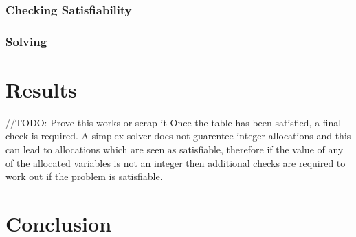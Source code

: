 \documentclass{report}
\begin{document}
\subsection {Checking Satisfiability}
\subsection {Solving}
\chapter {Results}

//TODO: Prove this works or scrap it
Once the table has been satisfied, a final check is required. A simplex solver does not guarentee integer allocations and this can lead to allocations which are seen as satisfiable, therefore if the value of any of the allocated variables is not an integer then additional checks are required to work out if the problem is satisfiable.

\chapter {Conclusion}
\end{document}
